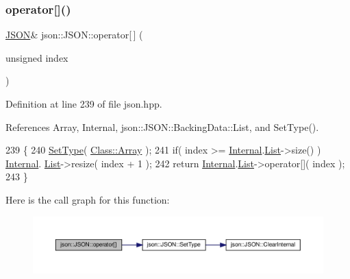 \subsubsection{\texorpdfstring{operator[]()}{operator[]()}\hspace{0.1cm}{\footnotesize\ttfamily [2/2]}}
{\footnotesize\ttfamily \mbox{\hyperlink{classjson_1_1_j_s_o_n}{J\+S\+ON}}\& json\+::\+J\+S\+O\+N\+::operator\mbox{[}$\,$\mbox{]} (\begin{DoxyParamCaption}\item[{unsigned}]{index }\end{DoxyParamCaption})\hspace{0.3cm}{\ttfamily [inline]}}



Definition at line 239 of file json.\+hpp.



References Array, Internal, json\+::\+J\+S\+O\+N\+::\+Backing\+Data\+::\+List, and Set\+Type().


\begin{DoxyCode}
239                                            \{
240             \mbox{\hyperlink{classjson_1_1_j_s_o_n_a668500208950e48394fc8bfe7c320205}{SetType}}( \mbox{\hyperlink{classjson_1_1_j_s_o_n_a762f55df6d407c1af61607ed516ffe07a4410ec34d9e6c1a68100ca0ce033fb17}{Class::Array}} );
241             \textcolor{keywordflow}{if}( index >= \mbox{\hyperlink{classjson_1_1_j_s_o_n_a1e2a064794c3d55c8bb8887fc5734947}{Internal}}.\mbox{\hyperlink{unionjson_1_1_j_s_o_n_1_1_backing_data_ab85f5e7ad21f9f7a5407ab73128a3ebc}{List}}->size() ) \mbox{\hyperlink{classjson_1_1_j_s_o_n_a1e2a064794c3d55c8bb8887fc5734947}{Internal}}.
      \mbox{\hyperlink{unionjson_1_1_j_s_o_n_1_1_backing_data_ab85f5e7ad21f9f7a5407ab73128a3ebc}{List}}->resize( index + 1 );
242             \textcolor{keywordflow}{return} \mbox{\hyperlink{classjson_1_1_j_s_o_n_a1e2a064794c3d55c8bb8887fc5734947}{Internal}}.\mbox{\hyperlink{unionjson_1_1_j_s_o_n_1_1_backing_data_ab85f5e7ad21f9f7a5407ab73128a3ebc}{List}}->operator[]( index );
243         \}
\end{DoxyCode}
Here is the call graph for this function\+:
\nopagebreak
\begin{figure}[H]
\begin{center}
\leavevmode
\includegraphics[width=350pt]{classjson_1_1_j_s_o_n_ad590ba3c1aa11aad67e03138ffdc1488_cgraph}
\end{center}
\end{figure}
\mbox{\label{classjson_1_1_j_s_o_n_a668500208950e48394fc8bfe7c320205}} 
